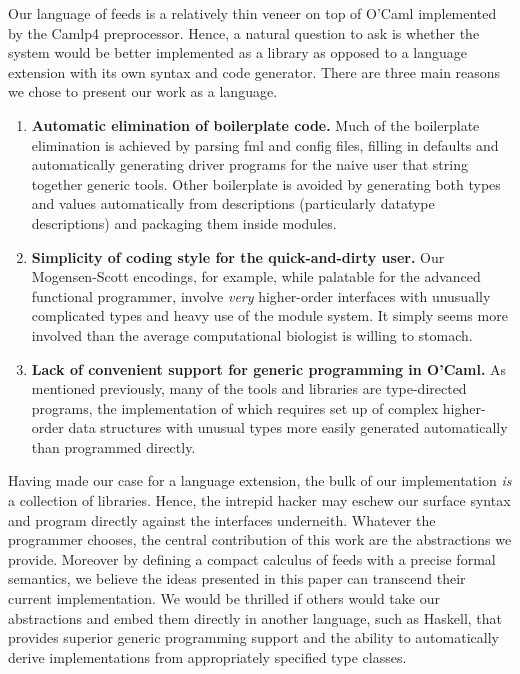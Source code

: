 Our language of feeds is a relatively thin veneer on top of O'Caml
implemented by the Camlp4 preprocessor.  
Hence, a natural question to ask is whether the system would be better
implemented as a library as opposed to a language extension with its
own syntax and code generator.  There are three main reasons we chose
to present our work as a language.
\begin{enumerate}
\item {\bf Automatic elimination of boilerplate code.} Much of the boilerplate 
elimination is achieved by parsing fml and config files, filling in 
defaults and automatically generating driver programs for the naive 
user that string together generic tools.  Other boilerplate is avoided
by generating both types and values automatically from descriptions
(particularly datatype descriptions) and packaging them inside modules.
\item {\bf Simplicity of coding style for the quick-and-dirty user.}  Our
Mogensen-Scott encodings, for example, while 
palatable for the advanced functional programmer, involve {\em very}
higher-order interfaces with unusually complicated types and heavy
use of the module system.  It simply seems more involved than the 
average computational biologist is willing to stomach.
\item {\bf Lack of convenient support for generic programming in O'Caml.} As mentioned
previously, many of the tools and libraries are type-directed programs, 
the implementation of which requires set up of complex higher-order 
data structures with unusual types more easily generated automatically
than programmed directly. 
\end{enumerate}
Having made our case for a language extension, the bulk of our implementation
{\em is} a collection of libraries.  Hence, the intrepid hacker may eschew our
surface syntax and program directly against the interfaces underneith.
Whatever the programmer chooses, the central contribution of this work
are the abstractions we provide.  Moreover
by defining a compact calculus of feeds with a precise formal
semantics, we believe the ideas presented in this paper can transcend
their current implementation.  We would be thrilled if others would
take our abstractions and embed them directly in another language,
such as Haskell, that provides superior generic programming support
and the ability to automatically derive implementations from appropriately
specified type classes.
